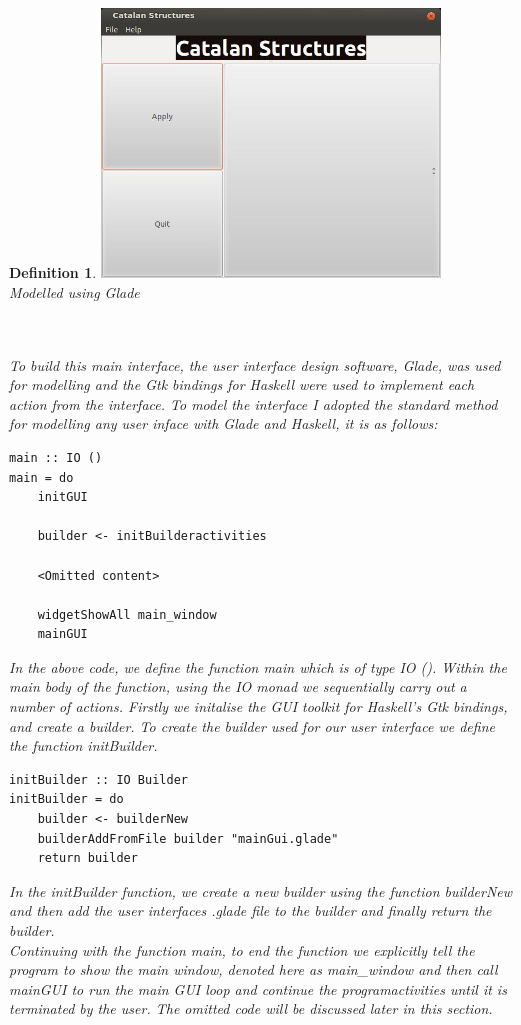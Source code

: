 \documentclass[12pt]{article}
\newtheorem{definition}{Definition}
\begin{document}
\begin{definition}
{\centering
\includegraphics[width=90mm]{mainGUIScreenshot.jpeg}\\
\caption{Modelled using Glade \cite{Glade}}}\\
\\
To build this main interface, the user interface design software, Glade, was used for modelling and the Gtk bindings for Haskell were used to implement each action from the interface. To model the interface I adopted the standard method for modelling any user inface with Glade and Haskell, it is as follows:
\begin{lstlisting}
main :: IO ()
main = do
	initGUI 
	
	builder <- initBuilderactivities

	<Omitted content>

	widgetShowAll main_window
	mainGUI 
\end{lstlisting}
In the above code, we define the function {\it main} which is of type {\it IO ()}. Within the main body of the function, using the IO monad we sequentially carry out a number of actions. Firstly we initalise the GUI toolkit for Haskell's Gtk bindings, and create a builder. To create the builder used for our user interface we define the function {\it initBuilder}.
\begin{lstlisting}
initBuilder :: IO Builder
initBuilder = do
	builder <- builderNew 
	builderAddFromFile builder "mainGui.glade" 
	return builder
\end{lstlisting}
In the {\it initBuilder} function, we create a new builder using the function {\it builderNew} and then add the user interfaces {\it .glade} file to the builder and finally return the builder.\\
Continuing with the function main, to end the function we explicitly tell the program to show the main window, denoted here as {\it main\_window} and then call mainGUI to run the main GUI loop and continue the programactivities until it is terminated by the user. The omitted code will be discussed later in this section.



\end{definition}
\end{document}
